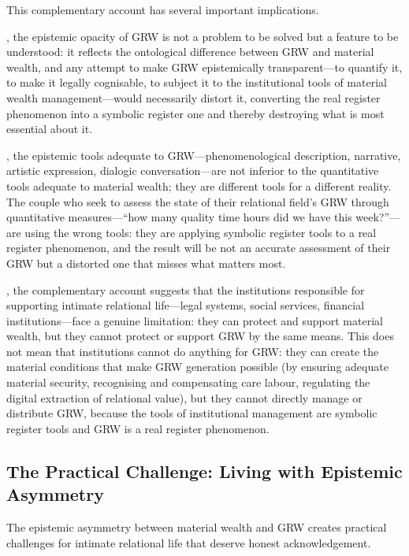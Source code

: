 This complementary account has several important implications.

, the epistemic opacity of GRW is not a problem to be solved but a feature to be understood: it reflects the ontological difference between GRW and material wealth, and any attempt to make GRW epistemically transparent---to quantify it, to make it legally cognisable, to subject it to the institutional tools of material wealth management---would necessarily distort it, converting the real register phenomenon into a symbolic register one and thereby destroying what is most essential about it.

, the epistemic tools adequate to GRW---phenomenological description, narrative, artistic expression, dialogic conversation---are not inferior to the quantitative tools adequate to material wealth; they are different tools for a different reality. The couple who seek to assess the state of their relational field's GRW through quantitative measures---``how many quality time hours did we have this week?''---are using the wrong tools: they are applying symbolic register tools to a real register phenomenon, and the result will be not an accurate assessment of their GRW but a distorted one that misses what matters most.

, the complementary account suggests that the institutions responsible for supporting intimate relational life---legal systems, social services, financial institutions---face a genuine limitation: they can protect and support material wealth, but they cannot protect or support GRW by the same means. This does not mean that institutions cannot do anything for GRW: they can create the material conditions that make GRW generation possible (by ensuring adequate material security, recognising and compensating care labour, regulating the digital extraction of relational value), but they cannot directly manage or distribute GRW, because the tools of institutional management are symbolic register tools and GRW is a real register phenomenon.

\subsection{The Practical Challenge: Living with Epistemic Asymmetry}
\label{p15:subsec:practical_challenge}

\noindent
The epistemic asymmetry between material wealth and GRW creates practical challenges for intimate relational life that deserve honest acknowledgement.

